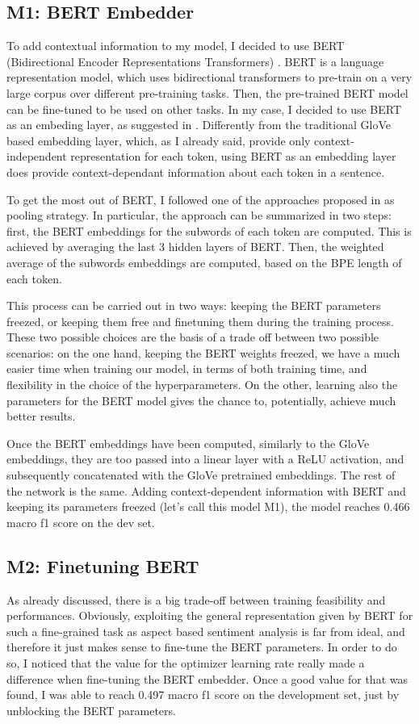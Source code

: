 \documentclass[11pt,a4paper]{article}
\begin{document}
	\subsection{M1: BERT Embedder}
	To add contextual information to my model, I decided to use BERT (Bidirectional
	Encoder Representations Transformers) \citep{devlin2018bert}. BERT is a language
	representation model, which uses bidirectional transformers to pre-train on a
	very large corpus over different pre-training tasks. Then, the pre-trained BERT
	model can be fine-tuned to be used on other tasks. In my case, I decided to use
	BERT as an embeding layer, as suggested in \citep{li2019exploiting}. Differently
	from the traditional GloVe based embedding layer, which, as I already said,
	provide only context-independent representation for each token, using BERT as an
	embedding layer does provide context-dependant information about each token in a
	sentence.
	
	To get the most out of BERT, I followed one of the approaches proposed in
	\citep{acs2021subword} as pooling strategy. In particular, the approach can be
	summarized in two steps: first, the BERT embeddings for the subwords of each
	token are computed. This is achieved by averaging the last 3 hidden layers of
	BERT. Then, the weighted average of the subwords embeddings are computed, based
	on the BPE length of each token.
	
	This process can be carried out in two ways: keeping the BERT parameters
	freezed, or keeping them free and finetuning them during the training process.
	These two possible choices are the basis of a trade off between two possible
	scenarios: on the one hand, keeping the BERT weights freezed, we have a much
	easier time when training our model, in terms of both training time, and
	flexibility in the choice of the hyperparameters. On the other, learning also
	the parameters for the BERT model gives the chance to, potentially, achieve much
	better results.
	
	Once the BERT embeddings have been computed, similarly to the GloVe embeddings,
	they are too passed into a linear layer with a ReLU activation, and subsequently
	concatenated with the GloVe pretrained embeddings. The rest of the network is
	the same. Adding context-dependent information with BERT and keeping its
	parameters freezed (let's call this model M1), the model reaches 0.466 macro f1
	score on the dev set.
	
	\subsection{M2: Finetuning BERT}
	As already discussed, there is a big trade-off between training feasibility and
	performances. Obviously, exploiting the general representation given by BERT for
	such a fine-grained task as aspect based sentiment analysis is far from ideal,
	and therefore it just makes sense to fine-tune the BERT parameters. In order to
	do so, I noticed that the value for the optimizer learning rate really made a
	difference when fine-tuning the BERT embedder. Once a good value for that was
	found, I was able to reach 0.497 macro f1 score on the development set, just by
	unblocking the BERT parameters.
	
\end{document}
